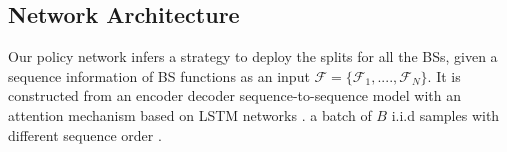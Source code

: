 %
%
%


  
\vspace{-2mm}
\subsection{ Network Architecture}
Our policy network infers a strategy to deploy the splits for all the BSs, given a sequence information of BS functions as an input $\mathcal{F} = \{\mathcal{F}_1, ...., \mathcal{F}_N \}$. It is constructed from an encoder decoder sequence-to-sequence model with an attention mechanism based on LSTM networks \cite{seq2seq,attention_bahdanau}.
 a batch of $B$ i.i.d samples with different sequence order . 

